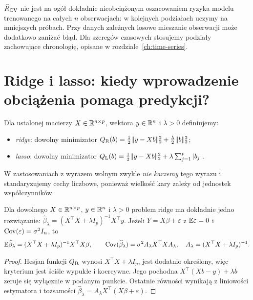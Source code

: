 \begin{uwaga}
$\widehat R_{\rm CV}$ nie jest na ogół dokładnie
nieobciążonym oszacowaniem ryzyka modelu trenowanego
na całych $n$ obserwacjach: w kolejnych podziałach
uczymy na mniejszych próbach. Przy danych zależnych
losowe mieszanie obserwacji może dodatkowo zaniżać błąd.
Dla szeregów czasowych stosujemy podziały zachowujące
chronologię, opisane w rozdziale~\ref{ch:time-series}.
\end{uwaga}

\section{Ridge i lasso: kiedy wprowadzenie obciążenia pomaga predykcji?}
\begin{definicja}
Dla ustalonej macierzy $X\in\mathbb R^{n\times p}$, wektora
$y\in\mathbb R^n$ i $\lambda>0$ definiujemy:
\begin{itemize}
\item \emph{ridge}: dowolny minimizator
$Q_{\rm R}(b)=\frac12\|y-Xb\|_2^2+\frac\lambda2\|b\|_2^2$;
\item \emph{lasso}: dowolny minimizator
$Q_{\rm L}(b)=\frac12\|y-Xb\|_2^2+\lambda\sum_{j=1}^p|b_j|$.
\end{itemize}
W zastosowaniach z wyrazem wolnym zwykle \emph{nie karzemy}
tego wyrazu i standaryzujemy cechy liczbowe, ponieważ
wielkość kary zależy od jednostek współczynników.
\end{definicja}

\begin{twierdzenie}
\label{thm:ridge}
Dla dowolnego $X\in\mathbb R^{n\times p}$, $y\in\mathbb R^n$
i $\lambda>0$ problem ridge ma dokładnie jedno rozwiązanie:
$\widehat\beta_\lambda=(X^\top X+\lambda I_p)^{-1}X^\top y$.
Jeżeli $Y=X\beta+\varepsilon$ z $\mathbb E\varepsilon=0$
i $\operatorname{Cov}(\varepsilon)=\sigma^2I_n$, to
\[
 \mathbb E\widehat\beta_\lambda=(X^\top X+\lambda I_p)^{-1}
 X^\top X\beta,
 \qquad
 \operatorname{Cov}(\widehat\beta_\lambda)=\sigma^2A_\lambda X^\top X A_\lambda,
 \quad A_\lambda=(X^\top X+\lambda I_p)^{-1}.
\]
\end{twierdzenie}
\begin{proof}
Hesjan funkcji $Q_{\rm R}$ wynosi
$X^\top X+\lambda I_p$, jest dodatnio określony, więc
kryterium jest ściśle wypukłe i koercywne.
Jego pochodna $X^\top(Xb-y)+\lambda b$ zeruje się
wyłącznie w podanym punkcie. Ostatnie równości
wynikają z liniowości estymatora i tożsamości
$\widehat\beta_\lambda=A_\lambda X^\top(X\beta+\varepsilon)$.
\end{proof}

